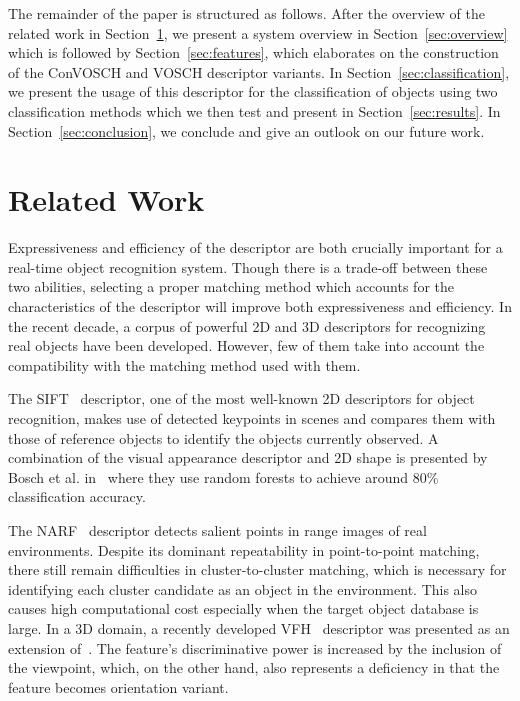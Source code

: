\documentclass[letterpaper, 10 pt, conference]{sty/ieeeconf}
\begin{document}
The remainder of the paper is structured as follows. After the overview of the related
work in Section~\ref{sec:rl}, we present a system overview in Section~\ref{sec:overview}
which is followed by Section~\ref{sec:features}, which elaborates on the construction of the
ConVOSCH and VOSCH descriptor variants. In Section~\ref{sec:classification}, we present the usage of this descriptor
for the classification of objects using two classification methods which we
then test and present in Section~\ref{sec:results}. In Section~\ref{sec:conclusion},
we conclude and give an outlook on our future work.

\section{Related Work}
\label{sec:rl}
Expressiveness and efficiency of the descriptor are both crucially important for
a real-time object recognition system.  Though there is a trade-off between
these two abilities, selecting a
proper matching method which accounts for the characteristics of the
descriptor will improve both expressiveness and efficiency. 
In the recent decade, a corpus of powerful 2D and 3D descriptors for
recognizing real objects have been developed. However, few of them take into
account the compatibility with the matching method used with them.

The SIFT~\cite{lowe04distinctive} descriptor, one of the most well-known 2D
descriptors for object recognition, makes use of detected keypoints in
scenes and compares them with those of reference objects to identify the
objects currently observed. A combination of the visual appearance
descriptor and 2D shape is presented by Bosch et al. in~\cite{Bosch07shape}
where they use random forests to achieve around 80\% classification 
accuracy. 

The NARF~\cite{steder10irosws} descriptor detects salient points in range images of
real environments. Despite its dominant
repeatability in point-to-point matching, there still remain difficulties in
cluster-to-cluster matching, which is necessary for identifying each cluster
candidate as an object in the environment. This also causes high computational cost
especially when the target object database is large. In a 3D domain, a recently 
developed VFH~\cite{vfh} descriptor was presented as an extension 
of~\cite{Rusu09ICRA}. The feature's discriminative power is increased
by the inclusion of the viewpoint, which, on the other hand, also represents
a deficiency in that the feature becomes orientation variant. 
\end{document}

